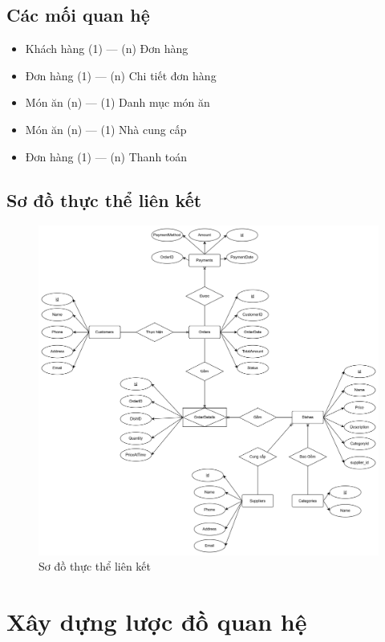 \documentclass{article}
\begin{document}
\subsection{Các mối quan hệ}

\begin{itemize}
    \item Khách hàng (1) --- (n) Đơn hàng
    \item Đơn hàng (1) --- (n) Chi tiết đơn hàng
    \item Món ăn (n) --- (1) Danh mục món ăn
    \item Món ăn (n) --- (1) Nhà cung cấp
    \item Đơn hàng (1) --- (n) Thanh toán
\end{itemize}

\subsection{Sơ đồ thực thể liên kết}

\begin{figure}[H]
    \centering
    \includegraphics[width=\textwidth]{EntityRelationship.png}
    \caption{Sơ đồ thực thể liên kết}
\end{figure}

\section{Xây dựng lược đồ quan hệ}
\end{document}
